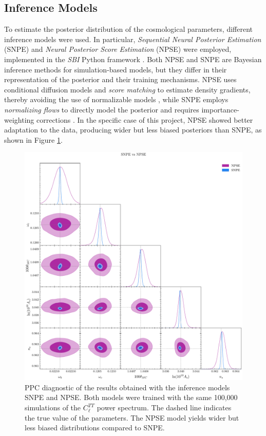 \subsection{Inference Models}
To estimate the posterior distribution of the cosmological parameters, different inference models were used. In particular, \textit{Sequential Neural Posterior Estimation} \cite{SNPE_C} (SNPE) and \textit{Neural Posterior Score Estimation} (NPSE) \cite{NPSE_1} \cite{NPSE_2} were employed, implemented in the \textit{SBI} Python framework \cite{SBI}. Both NPSE and SNPE are Bayesian inference methods for simulation-based models, but they differ in their representation of the posterior and their training mechanisms. NPSE uses conditional diffusion models and \textit{score matching} to estimate density gradients, thereby avoiding the use of normalizable models \cite{NPSE_1}, while SNPE employs \textit{normalizing flows} to directly model the posterior and requires importance-weighting corrections \cite{SNPE_C}. In the specific case of this project, NPSE showed better adaptation to the data, producing wider but less biased posteriors than SNPE, as shown in Figure \ref{fig:model_comparison}.  

\begin{figure}
    \centering
    \includegraphics[scale=0.35]{img/inference_model_comparison.pdf}
    \caption{PPC diagnostic of the results obtained with the inference models SNPE and NPSE. Both models were trained with the same 100,000 simulations of the $C_{\ell}^{TT}$ power spectrum. The dashed line indicates the true value of the parameters. The NPSE model yields wider but less biased distributions compared to SNPE.}
    \label{fig:model_comparison}
\end{figure}

